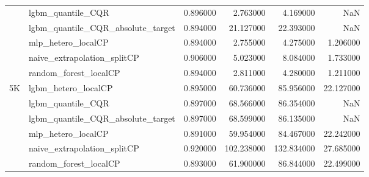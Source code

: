 \begin{tabular}{llrrrr}
 & lgbm\_quantile\_CQR & 0.896000 & 2.763000 & 4.169000 & NaN \\
 & lgbm\_quantile\_CQR\_absolute\_target & 0.894000 & 21.127000 & 22.393000 & NaN \\
 & mlp\_hetero\_localCP & 0.894000 & 2.755000 & 4.275000 & 1.206000 \\
 & naive\_extrapolation\_splitCP & 0.906000 & 5.023000 & 8.084000 & 1.733000 \\
 & random\_forest\_localCP & 0.894000 & 2.811000 & 4.280000 & 1.211000 \\
\cline{1-6}
\multirow[t]{6}{*}{5K} & lgbm\_hetero\_localCP & 0.895000 & 60.736000 & 85.956000 & 22.127000 \\
 & lgbm\_quantile\_CQR & 0.897000 & 68.566000 & 86.354000 & NaN \\
 & lgbm\_quantile\_CQR\_absolute\_target & 0.897000 & 68.599000 & 86.135000 & NaN \\
 & mlp\_hetero\_localCP & 0.891000 & 59.954000 & 84.467000 & 22.242000 \\
 & naive\_extrapolation\_splitCP & 0.920000 & 102.238000 & 132.834000 & 27.685000 \\
 & random\_forest\_localCP & 0.893000 & 61.900000 & 86.844000 & 22.499000 \\
\cline{1-6}
\bottomrule
\end{tabular}
